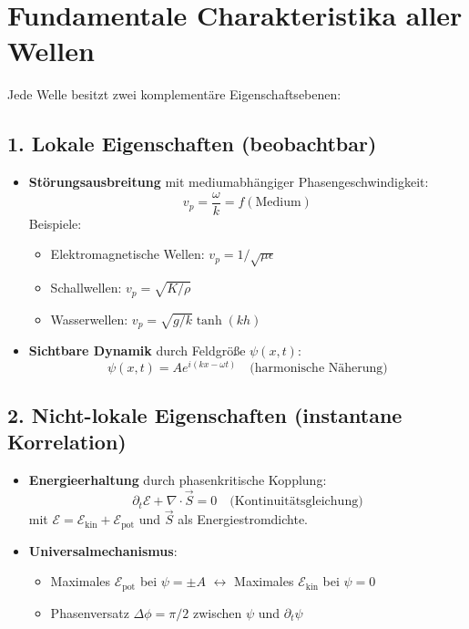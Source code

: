 \newpage
\section{Fundamentale Charakteristika aller Wellen}
Jede Welle besitzt zwei komplementäre Eigenschaftsebenen:

\subsection*{1. Lokale Eigenschaften (beobachtbar)}
\begin{itemize}
    \item \textbf{Störungsausbreitung} mit mediumabhängiger Phasengeschwindigkeit:
    \[
    v_p = \frac{\omega}{k} = f(\text{Medium})
    \]
    Beispiele:
    \begin{itemize}
        \item Elektromagnetische Wellen: $v_p = 1/\sqrt{\mu\epsilon}$
        \item Schallwellen: $v_p = \sqrt{K/\rho}$
        \item Wasserwellen: $v_p = \sqrt{g/k} \tanh(kh)$
    \end{itemize}
    
    \item \textbf{Sichtbare Dynamik} durch Feldgröße $\psi(x,t)$:
    \[
    \psi(x,t) = A e^{i(kx-\omega t)} \quad \text{(harmonische Näherung)}
    \]
\end{itemize}

\subsection*{2. Nicht-lokale Eigenschaften (instantane Korrelation)}
\begin{itemize}
    \item \textbf{Energieerhaltung} durch phasenkritische Kopplung:
    \[
    \partial_t \mathcal{E} + \nabla \cdot \vec{S} = 0 \quad \text{(Kontinuitätsgleichung)}
    \]
    mit $\mathcal{E} = \mathcal{E}_\text{kin} + \mathcal{E}_\text{pot}$ und $\vec{S}$ als Energiestromdichte.
    
    \item \textbf{Universalmechanismus}:
    \begin{itemize}
        \item Maximales $\mathcal{E}_\text{pot}$ bei $\psi = \pm A$ $\leftrightarrow$ Maximales $\mathcal{E}_\text{kin}$ bei $\psi = 0$
        \item Phasenversatz $\Delta\phi = \pi/2$ zwischen $\psi$ und $\partial_t\psi$
    \end{itemize}
\end{itemize}

